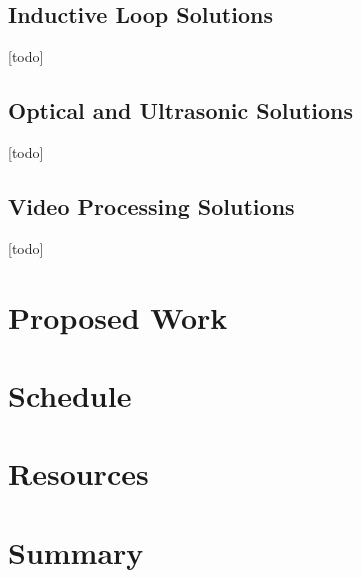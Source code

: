 \documentclass[letterpaper,10 pt,conference,onecolumn]{IEEEtran}
\begin{document}
	\subsection{Inductive Loop Solutions}
	[todo]
	
	\subsection{Optical and Ultrasonic Solutions}
	[todo]
	
	\subsection{Video Processing Solutions}
	[todo]
	
	\section{Proposed Work}

	\section{Schedule}
	
	\section{Resources}
	
	\section{Summary}
 
	
	
	
	
	
\end{document}
